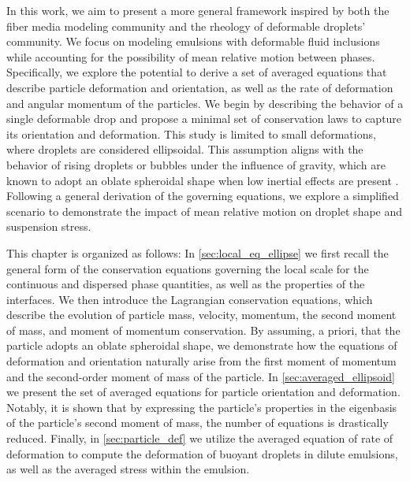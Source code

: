 In this work, we aim to present a more general framework inspired by both the fiber media modeling community and the rheology of deformable droplets' community. 
We focus on modeling emulsions with deformable fluid inclusions while accounting for the possibility of mean relative motion between phases. 
Specifically, we explore the potential to derive a set of averaged equations that describe particle deformation and orientation, as well as the rate of deformation and angular momentum of the particles.
We begin by describing the behavior of a single deformable drop and propose a minimal set of conservation laws to capture its orientation and deformation. 
This study is limited to small deformations, where droplets are considered ellipsoidal. 
This assumption aligns with the behavior of rising droplets or bubbles under the influence of gravity, which are known to adopt an oblate spheroidal shape when low inertial effects are present \citep{taylor1964deformation}. 
Following a general derivation of the governing equations, we explore a simplified scenario to demonstrate the impact of mean relative motion on droplet shape and suspension stress.

This chapter is organized as follows:
In \ref{sec:local_eq_ellipse} we first recall the general form of the conservation equations governing the local scale for the continuous and dispersed phase quantities, as well as the properties of the interfaces. 
We then introduce the Lagrangian conservation equations, which describe the evolution of particle mass, velocity, momentum, the second moment of mass, and moment of momentum conservation. 
By assuming, a priori, that the particle adopts an oblate spheroidal shape, we demonstrate how the equations of deformation and orientation naturally arise from the first moment of momentum and the second-order moment of mass of the particle.
In \ref{sec:averaged_ellipsoid} we present the set of averaged equations for particle orientation and deformation. 
Notably, it is shown that by expressing the particle's properties in the eigenbasis of the particle's second moment of mass, the number of equations is drastically reduced.
Finally, in \ref{sec:particle_def} we utilize the averaged equation of rate of deformation to compute the deformation of buoyant droplets in dilute emulsions, as well as the averaged stress within the emulsion. 

